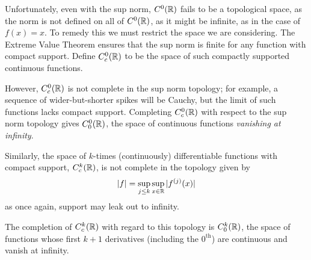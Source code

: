     Unfortunately, even with the sup norm, $C^0(\mathbb{R})$ fails to be a topological space, as the norm is not defined on all of $C^0(\mathbb{R})$, as it might be infinite, as in the case of $f(x)=x$.
    To remedy this we must restrict the space we are considering.
    The Extreme Value Theorem ensures that the sup norm is finite for any function with compact support.
    Define $C^0_c(\mathbb{R})$ to be the space of such compactly supported continuous functions.

    However, $C^0_c(\mathbb{R})$ is not complete in the sup norm topology; for example, a sequence of wider-but-shorter spikes will be Cauchy, but the limit of such functions lacks compact support. 
    Completing $C^0_c(\mathbb{R})$ with respect to the sup norm topology gives $C_0^0(\mathbb{R})$, the space of continuous functions \emph{vanishing at infinity}. 

    Similarly, the space of $k$-times (continuously) differentiable functions with compact support, $C_c^k(\mathbb{R})$, is not complete in the topology given by
    \begin{equation*}
      |f| = \sup_{j\le k} \sup_{x\in\mathbb{R}} |f^{(j)}(x)|
    \end{equation*}
    as once again, support may leak out to infinity.

    The completion of $C_c^k(\mathbb{R})$ with regard to this topology is $C_0^k(\mathbb{R})$, the space of functions whose first $k+1$ derivatives (including the $0^\text{th}$) are continuous and vanish at infinity. 



%



